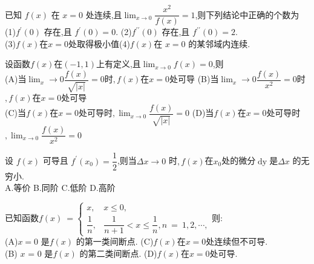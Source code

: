 \documentclass[8pt a4paper, oneside, UTF8]{ctexbook}  %
\begin{document}
\begin{sloppypar}
\begin{note}
    \end{note}
    \begin{problem}
        已知 $f(x)$ 在 $x=0$ 处连续,且$\lim_{x\to 0}\dfrac{x^2}{f(x)}=1$,则下列结论中正确的个数为\\
        (1)$f^{\prime}(0)$ 存在,且 $f^\prime(0)=0.$ \quad (2)$f^{\prime\prime}(0)$ 存在,且 $f^{\prime\prime}(0)=2.$\\
        (3)$f(x)$在$x=0$处取得极小值\quad (4)$f\left(x\right)$在 $x=0$ 的某邻域内连续.
    \end{problem}
    \begin{solution}
            
    \end{solution}
    \begin{note}
            
    \end{note}
    \begin{problem}
        设函数$f(x)$在$(-1,1)$上有定义,且$\lim_{x\to0}f(x)=0$,则\\
        (A)当$\lim_x\to0\dfrac{f(x)}{\sqrt{|x|}}=0$时$,f(x)$在$x=0$处可导
        (B)当$\lim_x\to0\dfrac{f(x)}{x^{2}}=0$时$,f(x)$在$x=0$处可导\\
        (C)当$f(x)$在$x=0$处可导时$,\lim_{x\to0}\dfrac{f(x)}{\sqrt{|x|}}=0$\quad
        (D)当$f(x)$在$x=0$处可导时$,\lim_{x\to0}\dfrac{f(x)}{x^{2}}=0$        
    \end{problem}
    \begin{solution}
            
    \end{solution}
    \begin{note}
            
    \end{note}
    \begin{problem}
        设 $f(x)$ 可导且 $f^\prime(x_0)=\dfrac12$,则当$\Delta x\to0$ 时$,f(x)$在$x_0$处的微分$\operatorname{dy}$是$\Delta x$ 的无穷小.\\
        A.等价 \quad B.同阶 \quad C.低阶 \quad D.高阶
    \end{problem}
    \begin{solution}
            
    \end{solution}
    \begin{note}
            
    \end{note}
    \begin{problem}
        已知函数$f(x)\:=\begin{cases}x,&x\leqslant0,\\\dfrac{1}{n},&\dfrac{1}{n+1}<x\leq\dfrac{1}{n},n\:=\:1,2,\cdots,\end{cases}$则:\\
        (A)$x=0$ 是$f(x)$ 的第一类间断点. \quad
        (C)$f(x)$在$x=0$处连续但不可导.\\
        (B) $x$ = 0 是$f(x)$ 的第二类间断点.\quad
        (D)$f(x)$在$x=0$处可导.
    \end{problem}
    \begin{solution}
            

\end{solution}
\end{sloppypar}
\end{document}

